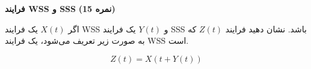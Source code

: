 \Large \textbf{فرایند WSS و SSS}
\large \textbf{(15 نمره)}

\normalsize \vspace{0.5cm}

	اگر
	$X\left( t \right)$
	یک فرایند WSS و
	$Y\left( t \right)$
	یک فرایند SSS باشد. نشان دهید فرایند
	$Z\left( t \right)$
	که به صورت زیر تعریف می‌شود، یک فرایند WSS است.
	
	$$
	Z\left( t \right) = X\left( {t + Y\left( t \right)} \right)
	$$


